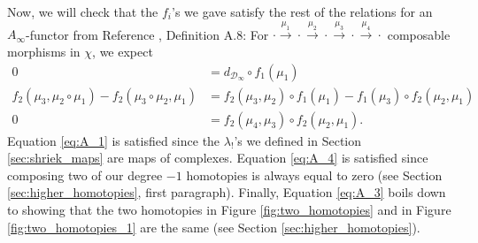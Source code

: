 %
Now, we will check that the $f_i$'s 
we gave satisfy the rest of the 
relations for an $A_\infty$-functor 
from Reference \cite{F}, Definition A.8:
For $\cdot 
\xrightarrow{\mu_1} \cdot 
\xrightarrow{\mu_2} \cdot
\xrightarrow{\mu_3} \cdot 
\xrightarrow{\mu_4} \cdot $ 
composable morphisms in $\chi$, 
we expect
\begin{align} 
0
&= 
d_{\mathcal{D}_\infty} \circ f_1(\mu_1)
\label{eq:A_1}\\
f_2(\mu_3, \mu_2 \circ \mu_1) - 
  f_2(\mu_3 \circ \mu_2, \mu_1)
&= 
f_2(\mu_3, \mu_2) \circ f_1(\mu_1) - 
  f_1(\mu_3) \circ f_2(\mu_2, \mu_1)
\label{eq:A_3}\\  
0
&= 
f_2(\mu_4, \mu_3) \circ f_2(\mu_2, \mu_1).  
\label{eq:A_4}
\end{align}
Equation \ref{eq:A_1} is satisfied 
since the $\lambda_!$'s we defined 
in Section \ref{sec:shriek_maps} are maps 
of complexes. Equation \ref{eq:A_4} is 
satisfied since composing two of our 
degree $-1$ homotopies is always equal to 
zero (see Section 
\ref{sec:higher_homotopies}, first 
paragraph). Finally, Equation \ref{eq:A_3} 
boils down to showing that the two 
homotopies in Figure \ref{fig:two_homotopies} 
and in Figure \ref{fig:two_homotopies_1} are 
the same (see Section 
\ref{sec:higher_homotopies}).




